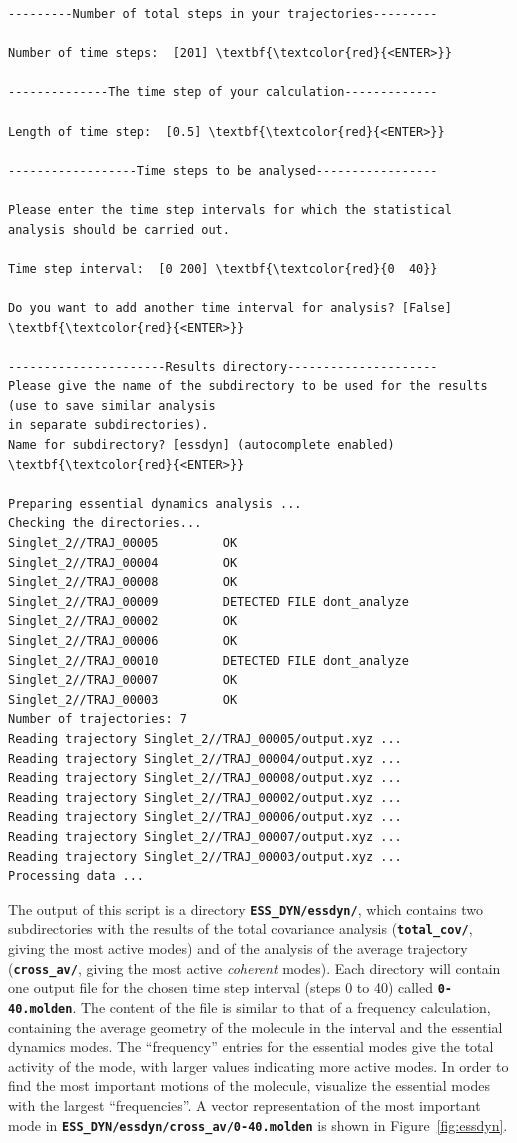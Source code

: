 \documentclass[a4paper,11pt,DIV=15,openany]{scrbook}
\newcommand{\ttt}[1]{\textbf{\texttt{#1}}}
\begin{document}
\begin{oframed}
\begin{Verbatim}[commandchars=\\\{\}]
---------Number of total steps in your trajectories---------

Number of time steps:  [201] \textbf{\textcolor{red}{<ENTER>}}

--------------The time step of your calculation-------------

Length of time step:  [0.5] \textbf{\textcolor{red}{<ENTER>}}

------------------Time steps to be analysed-----------------

Please enter the time step intervals for which the statistical analysis should be carried out. 

Time step interval:  [0 200] \textbf{\textcolor{red}{0  40}}

Do you want to add another time interval for analysis? [False] \textbf{\textcolor{red}{<ENTER>}}

----------------------Results directory---------------------
Please give the name of the subdirectory to be used for the results (use to save similar analysis
in separate subdirectories).
Name for subdirectory? [essdyn] (autocomplete enabled) \textbf{\textcolor{red}{<ENTER>}}

Preparing essential dynamics analysis ...
Checking the directories...
Singlet_2//TRAJ_00005         OK
Singlet_2//TRAJ_00004         OK
Singlet_2//TRAJ_00008         OK
Singlet_2//TRAJ_00009         DETECTED FILE dont_analyze
Singlet_2//TRAJ_00002         OK
Singlet_2//TRAJ_00006         OK
Singlet_2//TRAJ_00010         DETECTED FILE dont_analyze
Singlet_2//TRAJ_00007         OK
Singlet_2//TRAJ_00003         OK
Number of trajectories: 7
Reading trajectory Singlet_2//TRAJ_00005/output.xyz ...
Reading trajectory Singlet_2//TRAJ_00004/output.xyz ...
Reading trajectory Singlet_2//TRAJ_00008/output.xyz ...
Reading trajectory Singlet_2//TRAJ_00002/output.xyz ...
Reading trajectory Singlet_2//TRAJ_00006/output.xyz ...
Reading trajectory Singlet_2//TRAJ_00007/output.xyz ...
Reading trajectory Singlet_2//TRAJ_00003/output.xyz ...
Processing data ...
\end{Verbatim}
\end{oframed}

\normalsize
The output of this script is a directory \ttt{ESS\_DYN/essdyn/}, which contains two subdirectories with the results of the total covariance analysis (\ttt{total\_cov/}, giving the most active modes) and of the analysis of the average trajectory (\ttt{cross\_av/}, giving the most active \emph{coherent} modes).
Each directory will contain one output file for the chosen time step interval (steps 0 to 40) called \ttt{0-40.molden}.
The content of the file is similar to that of a frequency calculation, containing the average geometry of the molecule in the interval and the essential dynamics modes.
The ``frequency'' entries for the essential modes give the total activity of the mode, with larger values indicating more active modes.
In order to find the most important motions of the molecule, visualize the essential modes with the largest ``frequencies''.
A vector representation of the most important mode in \ttt{ESS\_DYN/essdyn/cross\_av/0-40.molden} is shown in Figure~\ref{fig:essdyn}.
\end{document}
